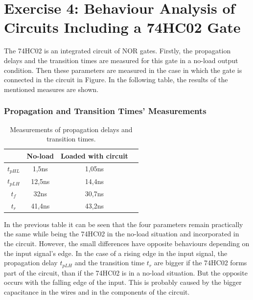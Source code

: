 \documentclass[a4paper,11pt]{report}
\begin{document}
\section{\color{olive}Exercise 4: Behaviour Analysis of Circuits Including a 74HC02 Gate}

The 74HC02 is an integrated circuit of NOR gates. Firstly, the propagation delays and the transition times are measured for this gate in a no-load output condition. Then these parameters are measured in the case in which the gate is connected in the circuit in Figure. %
In the following table, the results of the mentioned measures are shown.

\subsubsection{\color{red}Propagation and Transition Times' Measurements}


\begin{table}[h!]
\begin{center}
\begin{tabular}{|c|c|c|c|}
\hline
 & No-load & Loaded with circuit \\ %
\hline
\hline
 $t_{pHL}$ & 1,5ns & 1,05ns \\
\hline
 $t_{pLH}$ & 12,5ns & 14,4ns\\
\hline
 $t_{f}$ & 32ns & 30,7ns\\
\hline
 $t_{r}$ & 41,4ns & 43,2ns \\
\hline
\end{tabular}
\end{center}
\caption{\label{meas}Measurements of propagation delays and transition times.}
\end{table}




In the previous table it can be seen that the four parameters remain practically the same while being the 74HC02 in the no-load situation and incorporated in the circuit. However, the small differences have opposite behaviours depending on the input signal's edge. In the case of a rising edge in the input signal, the propagation delay $t_{pLH}$ and the transition time $t_{r}$ are bigger if the 74HC02 forms part of the circuit, than if the 74HC02 is in a no-load situation. But the opposite occurs with the falling edge of the input. This is probably caused by the bigger capacitance in the wires and in the components of the circuit.
\end{document}
